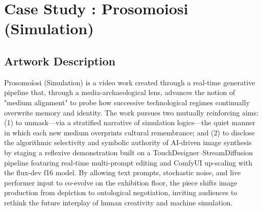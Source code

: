 \documentclass[sigconf,nonacm]{acmart}
\begin{document}
\section{Case Study : Prosomoiosi (Simulation)}

\subsection{Artwork Description}

Prosomoíosi (Simulation) is a video work created through a real-time generative pipeline that, through a media-archaeological lens, advances the notion of "medium alignment" to probe how successive technological regimes continually overwrite memory and identity. The work pursues two mutually reinforcing aims: (1) to unmask—via a stratified narrative of simulation logics—the quiet manner in which each new medium overprints cultural remembrance; and (2) to disclose the algorithmic selectivity and symbolic authority of AI-driven image synthesis by staging a reflexive demonstration built on a TouchDesigner–StreamDiffusion pipeline featuring real-time multi-prompt editing and ComfyUI up-scaling with the flux-dev f16 model. By allowing text prompts, stochastic noise, and live performer input to co-evolve on the exhibition floor, the piece shifts image production from depiction to ontological negotiation, inviting audiences to rethink the future interplay of human creativity and machine simulation.
\end{document}
